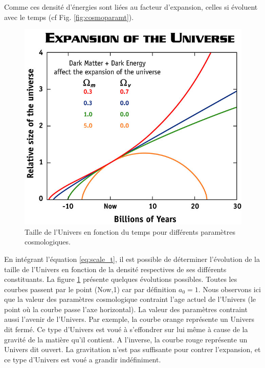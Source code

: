 Comme ces densité d'énergies sont liées au facteur d'expansion, celles si évoluent avec le temps (cf Fig. \ref{fig:cosmoparamt}).

\begin{figure}[bth]
        \includegraphics[width=.9\linewidth]{img/01/scale_t.jpg} 
        \caption{Taille de l'Univers en fonction du temps pour différents paramètres cosmologiques.
        }
 		\label{fig:scale_t}
\end{figure}

En intégrant l’équation \ref{eq:scale_t}, il est possible de déterminer l'évolution de la taille de l'Univers en fonction de la densité respectives de ses différents constituants.
La figure \ref{fig:scale_t} présente quelques évolutions possibles.
Toutes les courbes passent par le point (Now,1) car par définition $a_0 = 1$.
Nous observons ici que la valeur des paramètres cosmologique contraint l'age actuel de l'Univers (le point où la courbe passe l'axe horizontal).
La valeur des paramètres contraint aussi l'avenir de l'Univers.
Par exemple, la courbe orange représente un Univers dit fermé.
Ce type d'Univers est voué à s'effondrer sur lui même à cause de la gravité de la matière qu'il contient.
A l'inverse, la courbe rouge représente un Univers dit ouvert.
La gravitation n'est pas suffisante pour contrer l'expansion, et ce type d'Univers est voué a grandir indéfiniment.

